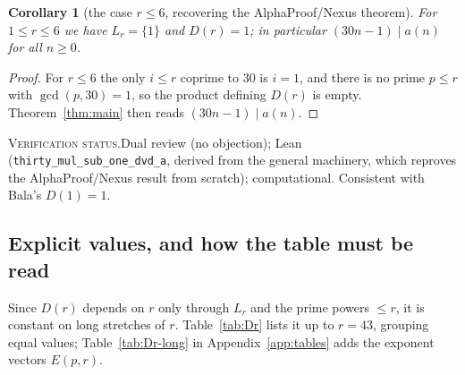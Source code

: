 \documentclass[11pt]{article}
\theoremstyle{plain}
\newtheorem{corollary}[theorem]{Corollary}
\theoremstyle{definition}
\theoremstyle{remark}
\numberwithin{equation}{section}
\newcommand{\Lr}{L_r}
\newcommand{\vstatus}[1]{%
  \par\vspace{3pt}\noindent
  {\small\textsc{Verification status.}\enspace #1}\par\vspace{3pt}}
\begin{document}
\begin{corollary}[the case $r \le 6$, recovering the AlphaProof/Nexus theorem]
\label{cor:r1}
For $1 \le r \le 6$ we have $\Lr = \{1\}$ and $D(r) = 1$; in particular $(30n-1) \mid a(n)$ for
all $n \ge 0$.
\end{corollary}

\begin{proof}
For $r \le 6$ the only $i \le r$ coprime to $30$ is $i=1$, and there is no prime $p \le r$ with
$\gcd(p,30)=1$, so the product defining $D(r)$ is empty. Theorem~\ref{thm:main} then reads
$(30n-1) \mid a(n)$.
\end{proof}
\vstatus{Dual review (no objection); Lean (\texttt{thirty\_mul\_sub\_one\_dvd\_a}, derived from
the general machinery, which reproves the AlphaProof/Nexus result from scratch);
computational. Consistent with Bala's $D(1)=1$.}

\subsection{Explicit values, and how the table must be read}
\label{sec:values}

Since $D(r)$ depends on $r$ only through $\Lr$ and the prime powers $\le r$, it is constant on
long stretches of $r$. Table~\ref{tab:Dr} lists it up to $r = 43$, grouping equal values;
Table~\ref{tab:Dr-long} in Appendix~\ref{app:tables} adds the exponent vectors $E(p,r)$.
\end{document}
